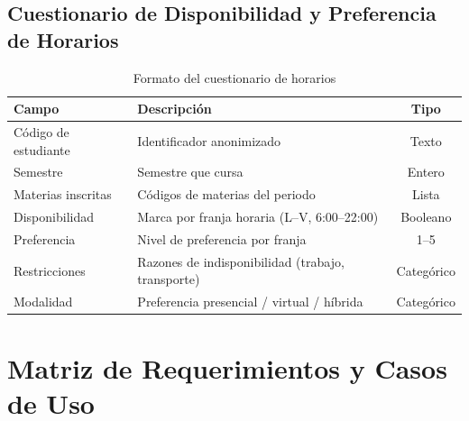 \section{Cuestionario de Disponibilidad y Preferencia de Horarios}

\begin{table}[H]
\centering
\caption{Formato del cuestionario de horarios}
\label{tab:cuestionario-horario}
\small
\begin{tabularx}{\textwidth}{@{}l X c@{}}
\toprule
\rowcolor{moradoClaro}
\textbf{Campo} & \textbf{Descripción} & \textbf{Tipo} \\
\midrule
Código de estudiante & Identificador anonimizado & Texto \\
Semestre & Semestre que cursa & Entero \\
Materias inscritas & Códigos de materias del periodo & Lista \\
Disponibilidad & Marca por franja horaria (L--V, 6:00--22:00) & Booleano \\
Preferencia & Nivel de preferencia por franja & 1--5 \\
Restricciones & Razones de indisponibilidad (trabajo, transporte) & Categórico \\
Modalidad & Preferencia presencial / virtual / híbrida & Categórico \\
\bottomrule
\end{tabularx}
\end{table}

\chapter{Matriz de Requerimientos y Casos de Uso}
\label{ap:trazabilidad}

